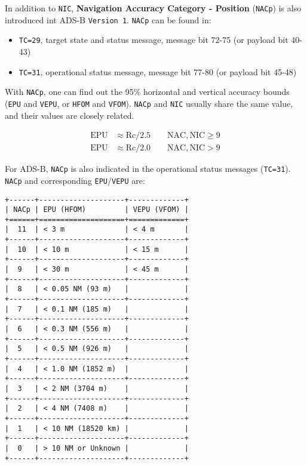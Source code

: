 In addition to \texttt{NIC}, \textbf{Navigation Accuracy Category -
Position} (\texttt{NACp}) is also introduced int ADS-B
\texttt{Version\ 1}. \texttt{NACp} can be found in:

\begin{itemize}

\item
  \texttt{TC=29}, target state and status message, message bit 72-75 (or
  payload bit 40-43)
\item
  \texttt{TC=31}, operational status message, message bit 77-80 (or
  payload bit 45-48)
\end{itemize}

With \texttt{NACp}, one can find out the 95\% horizontal and vertical
accuracy bounds (\texttt{EPU} and \texttt{VEPU}, or \texttt{HFOM} and
\texttt{VFOM}). \texttt{NACp} and \texttt{NIC} usually share the same
value, and their values are closely related.

\begin{equation}
  \begin{split}
    \mathrm{EPU} &\approx \mathrm{Rc} / 2.5   \qquad  \mathrm{NAC, NIC} \ge 9 \\
    \mathrm{EPU} &\approx \mathrm{Rc} / 2.0  \qquad  \mathrm{NAC, NIC} > 9
  \end{split}
\end{equation}

For ADS-B, \texttt{NACp} is also indicated in the operational status
messages (\texttt{TC=31}). \texttt{NACp} and corresponding
\texttt{EPU}/\texttt{VEPU} are:

\begin{verbatim}
+------+--------------------+-------------+
| NACp | EPU (HFOM)         | VEPU (VFOM) |
+======+====================+=============+
|  11  | < 3 m              | < 4 m       |
+------+--------------------+-------------+
|  10  | < 10 m             | < 15 m      |
+------+--------------------+-------------+
|  9   | < 30 m             | < 45 m      |
+------+--------------------+-------------+
|  8   | < 0.05 NM (93 m)   |             |
+------+--------------------+-------------+
|  7   | < 0.1 NM (185 m)   |             |
+------+--------------------+-------------+
|  6   | < 0.3 NM (556 m)   |             |
+------+--------------------+-------------+
|  5   | < 0.5 NM (926 m)   |             |
+------+--------------------+-------------+
|  4   | < 1.0 NM (1852 m)  |             |
+------+--------------------+-------------+
|  3   | < 2 NM (3704 m)    |             |
+------+--------------------+-------------+
|  2   | < 4 NM (7408 m)    |             |
+------+--------------------+-------------+
|  1   | < 10 NM (18520 km) |             |
+------+--------------------+-------------+
|  0   | > 10 NM or Unknown |             |
+------+--------------------+-------------+
\end{verbatim}


